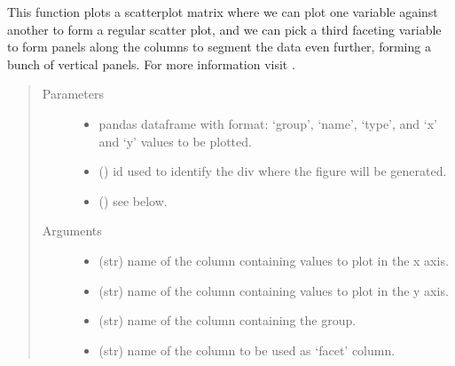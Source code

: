 \documentclass[letterpaper,10pt,english]{sphinxmanual}
\begin{document}
\begin{fulllineitems}
\label{\detokenize{_autosummary/analytics_core.viz:analytics_core.viz.viz.get_facet_grid_plot}}
This function plots a scatterplot matrix where we can plot one variable against another to form a regular scatter plot, and we can pick a third faceting variable
to form panels along the columns to segment the data even further, forming a bunch of vertical panels. For more information visit .
\begin{quote}\begin{description}
\item[{Parameters}] \leavevmode\begin{itemize}
\item {} 
 \textendash{} pandas dataframe with format: ‘group’, ‘name’, ‘type’, and ‘x’ and ‘y’ values to be plotted.

\item {} 
 () \textendash{} id used to identify the div where the figure will be generated.

\item {} 
 () \textendash{} see below.

\end{itemize}

\item[{Arguments}] \leavevmode\begin{itemize}
\item {} 
 (str) \textendash{} name of the column containing values to plot in the x axis.

\item {} 
 (str) \textendash{} name of the column containing values to plot in the y axis.

\item {} 
 (str) \textendash{} name of the column containing the group.

\item {} 
 (str) \textendash{} name of the column to be used as ‘facet’ column.


\end{itemize}
\end{description}
\end{quote}
\end{fulllineitems}
\end{document}
